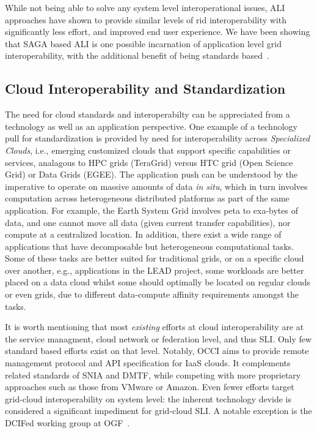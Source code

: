 \documentclass[10pt,conference,final,letterpaper,twoside,twocolumn,]{IEEEtran}
\newcommand{\I}[1]{\textit{#1}}
\begin{document}
 While not being able to solve any system level interoperational
 issues, ALI approaches have shown to provide similar levels of rid
 interoperability with significantly less effort, and improved end
 user experience.  We have been showing that SAGA based ALI is one
 possible incarnation of application level grid interoperability, with
 the additional benefit of being standards based~\cite{saga-gin,
 mandelbrot-www}.



 \subsection*{Cloud Interoperability and Standardization}

 The need for cloud standards and interoperabilty can be appreciated
 from a technology as well as an application perspective. One example
 of a technology pull for standardization is provided by need for
 interoperability across {\it Specialized Clouds}, i.e., emerging
 customized clouds that support specific capabilities or services,
 analagous to HPC grids (TeraGrid) versus HTC grid (Open Science Grid)
 or Data Grids (EGEE).  The application push can be understood by the
 imperative to operate on massive amounts of data {\it in situ}, which
 in turn involves computation across heterogeneous distributed
 platforms as part of the same application.  For example, the Earth
 System Grid involves peta to exa-bytes of data, and one cannot move
 all data (given current transfer capabilities), nor compute at a
 centralized location.  In addition, there exist a wide range of
 applications that have decomposable but heterogeneous computational
 tasks.  Some of these tasks are better suited for traditional grids,
 or on a specific cloud over another, e.g., applications in the LEAD
 project, some workloads are better placed on a data cloud whilst some
 should optimally be located on regular clouds or even grids, due to
 different data-compute affinity requirements amongst the tasks. 

 It is worth mentioning that most \I{existing} efforts at cloud
 interoperability are at the service managment, cloud network or
 federation level, and thus SLI.  Only few standard based efforts
 exist on that level.  Notably, OCCI aims to provide remote management
 protocol and API specification for IaaS clouds.  It complements
 related standards of SNIA and DMTF, while competing with more
 proprietary approaches such as those from VMware or Amazon.  Even
 fewer efforts target grid-cloud interoperability on system level: the
 inherent technology devide is considered a significant impediment for
 grid-cloud SLI.  A notable exception is the DCIFed working group at
 OGF~\cite{dcifed-www}.
 
\end{document}
